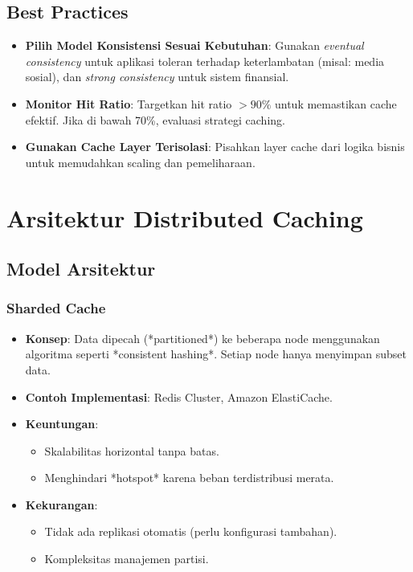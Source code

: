 \documentclass[11pt, a4paper]{book}
\begin{document}
	\section*{Best Practices}
	\label{sec:best-practices-distributed}
	
	\begin{itemize}
		\item \textbf{Pilih Model Konsistensi Sesuai Kebutuhan}:  
		Gunakan \textit{eventual consistency} untuk aplikasi toleran terhadap keterlambatan (misal: media sosial), dan \textit{strong consistency} untuk sistem finansial.
		
		\item \textbf{Monitor Hit Ratio}:  
		Targetkan hit ratio $> 90\%$ untuk memastikan cache efektif. Jika di bawah 70\%, evaluasi strategi caching.
		
		\item \textbf{Gunakan Cache Layer Terisolasi}:  
		Pisahkan layer cache dari logika bisnis untuk memudahkan scaling dan pemeliharaan.
	\end{itemize}
	
	\chapter{Arsitektur Distributed Caching}
	\label{chap:arsitektur}
	
	\section{Model Arsitektur}
	\label{sec:model-arsitektur}
	
	\subsection{Sharded Cache}
	\label{subsec:sharded}
	
	\begin{itemize}
		\item \textbf{Konsep}:  
		Data dipecah (*partitioned*) ke beberapa node menggunakan algoritma seperti *consistent hashing*. Setiap node hanya menyimpan subset data.
		
		\item \textbf{Contoh Implementasi}:  
		Redis Cluster, Amazon ElastiCache.
		
		\item \textbf{Keuntungan}:
		\begin{itemize}
			\item Skalabilitas horizontal tanpa batas.
			\item Menghindari *hotspot* karena beban terdistribusi merata.
		\end{itemize}
		
		\item \textbf{Kekurangan}:
		\begin{itemize}
			\item Tidak ada replikasi otomatis (perlu konfigurasi tambahan).
			\item Kompleksitas manajemen partisi.
		\end{itemize}
	\end{itemize}
	
\end{document}
